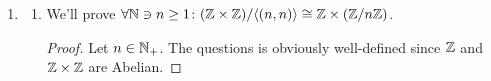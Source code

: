 \documentclass[a4paper]{article}
\begin{document}
	\section{}
	\section{}
	
	\begin{enumerate}
		\item 
		\begin{enumerate}
			\item We'll prove $\forall \mathbb{N} \ni n \ge 1 \colon (\mathbb{Z} \times \mathbb{Z}) / \langle (n, n) \rangle \cong \mathbb{Z} \times (\mathbb{Z} / n\mathbb{Z})$. \begin{proof}
				Let $n \in \mathbb{N}_+$. The questions is obviously well-defined since $\mathbb{Z}$ and $\mathbb{Z} \times \mathbb{Z}$ are Abelian. 
				

\end{proof}
\end{enumerate}
\end{enumerate}
\end{document}
